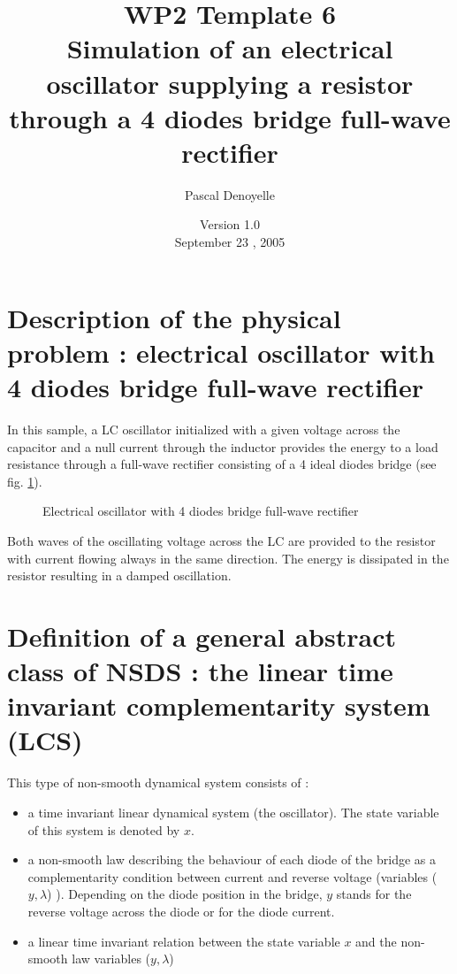 \documentclass[10pt]{article}
\begin{document}
\thispagestyle{empty}
\title{WP2 Template 6 \\Simulation of an electrical oscillator supplying a resistor\\
through a 4 diodes bridge full-wave rectifier}
\author{Pascal Denoyelle}

\date{Version 1.0 \\
 September 23 , 2005}
\maketitle


\pagestyle{fancy}

\section{Description of the physical problem : electrical oscillator with 4 diodes bridge full-wave rectifier}
In this sample, a LC oscillator initialized with a given voltage across the capacitor and a null current through
the inductor provides the energy
to a load resistance through a full-wave rectifier consisting of a 4 ideal diodes bridge (see fig. \ref{fig-DiodeBridge}).

\begin{figure}[hp]
\centerline{
  \scalebox{0.75}{
     
  }
}
\caption{Electrical oscillator with 4 diodes bridge full-wave rectifier}
\label{fig-DiodeBridge}
\end{figure}

Both waves of the oscillating voltage across the LC are provided to the resistor with current flowing always in
the same direction. The energy is dissipated in the resistor resulting in a damped oscillation.


\section{Definition of a general abstract class of NSDS : the linear time invariant complementarity system (LCS)}
\label{sec-def-NSDS}
This type of non-smooth dynamical system consists of :

\begin{itemize}
\item a time invariant linear dynamical system (the oscillator). The state variable of this system is denoted by $x$.
\item a non-smooth law describing the behaviour of each diode of the bridge as a complementarity condition between current and
reverse voltage (variables ($y,\lambda$) ). Depending on the diode position in the bridge, $y$ stands for the reverse voltage
across the diode or for the diode current.
\item a linear time invariant relation between the state variable $x$ and the non-smooth law variables ($y,\lambda$)
\end{itemize}
\end{document}
